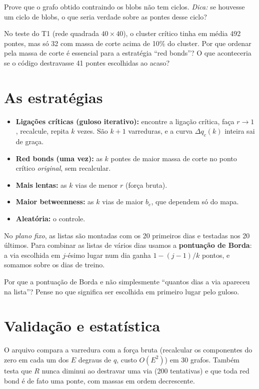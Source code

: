 \documentclass[11pt]{article}
\begin{document}
 Prove que o grafo obtido contraindo os blobs não tem ciclos. \emph{Dica:} se houvesse um ciclo de blobs, o que seria verdade sobre as pontes desse ciclo?

 No teste do T1 (rede quadrada $40\times40$), o cluster crítico tinha em média 492 pontes, mas só 32 com massa de corte acima de 10\% do cluster. Por que ordenar pela massa de corte é essencial para a estratégia ``red bonds''? O que aconteceria se o código destravasse 41 pontes escolhidas ao acaso?

\section{As estratégias}

\begin{itemize}
  \item \textbf{Ligações críticas (guloso iterativo):} encontre a ligação crítica, faça $r\to1$, recalcule, repita $k$ vezes. São $k+1$ varreduras, e a curva $\Delta q_c(k)$ inteira sai de graça.
  \item \textbf{Red bonds (uma vez):} as $k$ pontes de maior massa de corte no ponto crítico \emph{original}, sem recalcular.
  \item \textbf{Mais lentas:} as $k$ vias de menor $r$ (força bruta).
  \item \textbf{Maior betweenness:} as $k$ vias de maior $b_e$, que dependem só do mapa.
  \item \textbf{Aleatória:} o controle.
\end{itemize}

No \emph{plano fixo}, as listas são montadas com os 20 primeiros dias e testadas nos 20 últimos. Para combinar as listas de vários dias usamos a \textbf{pontuação de Borda}: a via escolhida em $j$-ésimo lugar num dia ganha $1-(j-1)/k$ pontos, e somamos sobre os dias de treino.

 Por que a pontuação de Borda e não simplesmente ``quantos dias a via apareceu na lista''? Pense no que significa ser escolhida em primeiro lugar pelo guloso.

\section{Validação e estatística}

O arquivo  compara a varredura com a força bruta (recalcular os componentes do zero em cada um dos $E$ degraus de $q$, custo $O(E^2)$) em 30 grafos. Também testa que $R$ nunca diminui ao destravar uma via (200 tentativas) e que toda red bond é de fato uma ponte, com massas em ordem decrescente.
\end{document}
